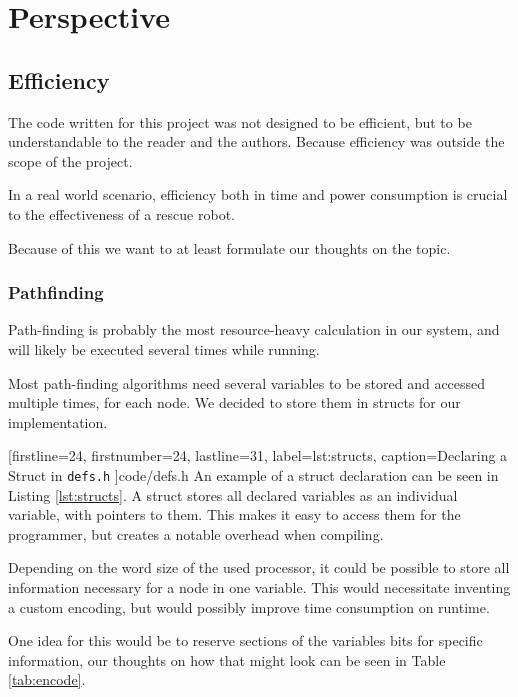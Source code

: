 \chapter{Perspective}
\section{Efficiency}
The code written for this project was not designed to be efficient,
but to be understandable to the reader and the authors.
Because efficiency was outside the scope of the project.

In a real world scenario,
efficiency both in time and power consumption is crucial to the effectiveness of a rescue robot.

Because of this we want to at least formulate our thoughts on the topic.
\subsection{Pathfinding}
Path-finding is probably the most resource-heavy calculation in our system,
and will likely be executed several times while running.

Most path-finding algorithms need several variables to be stored and accessed multiple times,
for each node.
We decided to store them in structs for our implementation.


[firstline=24,				%
firstnumber=24,
lastline=31,
label=lst:structs,	%
caption={Declaring a Struct  in {\tt defs.h}}
]{code/defs.h}
%
An example of a struct declaration can be seen in Listing \ref{lst:structs}.
A struct stores all declared variables as an individual variable,
with pointers to them.
This makes it easy to access them for the programmer,
but creates a notable overhead when compiling.

Depending on the word size of the used processor,
it could be possible to store all information necessary for a node in one variable.
This would necessitate inventing a custom encoding,
but would possibly improve time consumption on runtime.

One idea for this would be to reserve sections of the variables bits for specific information,
our thoughts on how that might look can be seen in Table \ref{tab:encode}.

